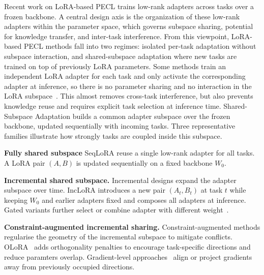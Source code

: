 \documentclass{article}
\theoremstyle{plain}
\theoremstyle{definition}
\theoremstyle{remark}
\begin{document}
Recent work on LoRA-based PECL trains low-rank adapters across tasks over a frozen backbone\cite{}. A central design axis is the organization of these low-rank adapters within the parameter space, which governs subspace sharing, potential for knowledge transfer, and inter-task interference.
From this viewpoint, LoRA-based PECL methods fall into two regimes: isolated per-task adaptation without subspace interaction, and shared-subspace adaptation where new tasks are trained on top of previously LoRA parameters.
Some methods train an independent LoRA adapter for each task and only activate the corresponding adapter at inference, so there is no parameter sharing and no interaction in the LoRA subspace~\citep{Yu_2024_CVPR}. This almost removes cross-task interference, but also prevents knowledge reuse and requires explicit task selection at inference time.
Shared-Subspace Adaptation builds a common adapter subspace over the frozen backbone, updated sequentially with incoming tasks. Three representative families illustrate how strongly tasks are coupled inside this subspace.

    
    \textbf{Fully shared subspace}
    SeqLoRA reuse a single low-rank adapter for all tasks. A LoRA pair $(A,B)$ is updated sequentially on a fixed backbone $W_0$. 

    
    \textbf{Incremental shared subspace.}
    Incremental designs expand the adapter subspace over time. IncLoRA introduces a new pair $(A_t,B_t)$ at task $t$ while keeping $W_0$ and earlier adapters fixed and composes all adapters at inference.
    Gated variants further select or combine adapter with different weight~\citep{Gao_2023_ICCV,10.1145/3730436.3730456,zhao-etal-2024-sapt,cheng2025exploiting,wu2025sdlorascalabledecoupledlowrank}.

    
    \textbf{Constraint-augmented incremental sharing.}
    Constraint-augmented methods regularise the geometry of the incremental subspace to mitigate conflicts. OLoRA~\citep{wang2023orthogonal} adds orthogonality penalties to encourage task-specific directions and reduce paramters overlap. Gradient-level approaches~\citep{Liang_2024_CVPR,yang2024parametercollisionhinderingcontinual} align or project gradients away from previously occupied directions. 
\end{document}
